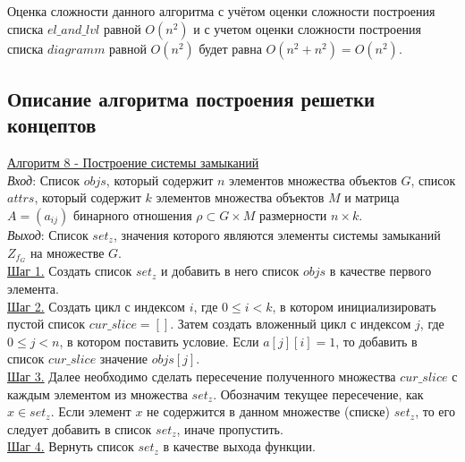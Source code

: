 \documentclass[bachelor, och, labwork]{shiza}
\begin{document}
            Оценка сложности данного алгоритма с учётом оценки сложности построения списка $el\_and\_lvl$ равной $O(n^2)$ и с учетом оценки сложности
            построения списка $diagramm$ равной $O(n^2)$ будет равна $O(n^2 + n^2) = O(n^2)$.\\


    \subsection{Описание алгоритма построения решетки концептов}

        \underline{Алгоритм 8 - Построение системы замыканий}\\
            \textit{Вход}: Список $objs$, который содержит $n$ элементов множества объектов $G$, список $attrs$, 
            который содержит $k$ элементов множества объектов $M$ и матрица $A = (a_{ij})$ бинарного отношения
            $\rho \subset G \times M$ размерности $n \times k$. \\
            \textit{Выход}: Список $set_z$, значения которого являются элементы системы замыканий $Z_{f_G}$
            на множестве $G$.\\
            \underline{Шаг 1.} Создать список $set_z$ и добавить в него список $objs$ в качестве первого элемента.\\
            \underline{Шаг 2.} Создать цикл с индексом $i$, где $0 \leq i < k$, в котором инициализировать пустой список $cur\_slice = []$.
            Затем создать вложенный цикл с индексом $j$, где $0 \leq j < n$, в котором поставить условие. Если $a[j][i] = 1$, то добавить
            в список $cur\_slice$ значение $objs[j]$.\\
            \underline{Шаг 3.} Далее необходимо сделать пересечение полученного множества $cur\_slice$ с каждым элементом из множества
            $set_z$. Обозначим текущее пересечение, как $x \in set_z$. Если элемент $x$ не содержится в данном множестве (списке) $set_z$,
            то его следует добавить в список $set_z$, иначе пропустить.\\
            \underline{Шаг 4.} Вернуть список $set_z$ в качестве выхода функции.\\ 
            
\end{document}
